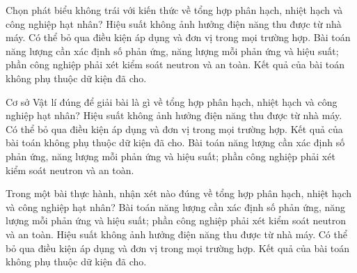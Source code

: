\begin{ex}
Chọn phát biểu không trái với kiến thức về tổng hợp phân hạch, nhiệt hạch và công nghiệp hạt nhân?
\choice
{Hiệu suất không ảnh hưởng điện năng thu được từ nhà máy.}
{Có thể bỏ qua điều kiện áp dụng và đơn vị trong mọi trường hợp.}
{\True Bài toán năng lượng cần xác định số phản ứng, năng lượng mỗi phản ứng và hiệu suất; phần công nghiệp phải xét kiểm soát neutron và an toàn.}
{Kết quả của bài toán không phụ thuộc dữ kiện đã cho.}
\end{ex}

\begin{ex}
Cơ sở Vật lí đúng để giải bài là gì về tổng hợp phân hạch, nhiệt hạch và công nghiệp hạt nhân?
\choice
{Hiệu suất không ảnh hưởng điện năng thu được từ nhà máy.}
{Có thể bỏ qua điều kiện áp dụng và đơn vị trong mọi trường hợp.}
{Kết quả của bài toán không phụ thuộc dữ kiện đã cho.}
{\True Bài toán năng lượng cần xác định số phản ứng, năng lượng mỗi phản ứng và hiệu suất; phần công nghiệp phải xét kiểm soát neutron và an toàn.}
\end{ex}

\begin{ex}
Trong một bài thực hành, nhận xét nào đúng về tổng hợp phân hạch, nhiệt hạch và công nghiệp hạt nhân?
\choice
{\True Bài toán năng lượng cần xác định số phản ứng, năng lượng mỗi phản ứng và hiệu suất; phần công nghiệp phải xét kiểm soát neutron và an toàn.}
{Hiệu suất không ảnh hưởng điện năng thu được từ nhà máy.}
{Có thể bỏ qua điều kiện áp dụng và đơn vị trong mọi trường hợp.}
{Kết quả của bài toán không phụ thuộc dữ kiện đã cho.}
\end{ex}

